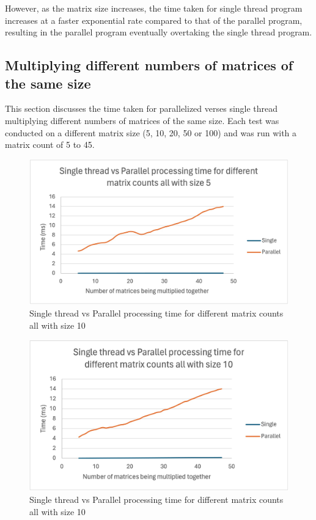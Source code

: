 However, as the matrix size increases, the time taken for single thread program increases at a faster exponential rate compared to that of the parallel program, resulting in the parallel program eventually overtaking the single thread program.

\subsection{Multiplying different numbers of matrices of the same size}
This section discusses the time taken for parallelized verses single thread multiplying different numbers of matrices of the same size.
Each test was conducted on a different matrix size (5, 10, 20, 50 or 100) and was run with a matrix count of 5 to 45.

\begin{figure}[H]
    \centering
    \includegraphics[width=1\columnwidth]{Figures/different_matrix_counts_size_5}
    \caption{Single thread vs Parallel processing time for different matrix counts all with size 10}
    \label{fig:different_matrix_counts_size 5}
\end{figure}

\begin{figure}[H]
    \centering
    \includegraphics[width=1\columnwidth]{Figures/different_matrix_counts_size_10}
    \caption{Single thread vs Parallel processing time for different matrix counts all with size 10}
    \label{fig:different_matrix_counts_size 10}
\end{figure}

